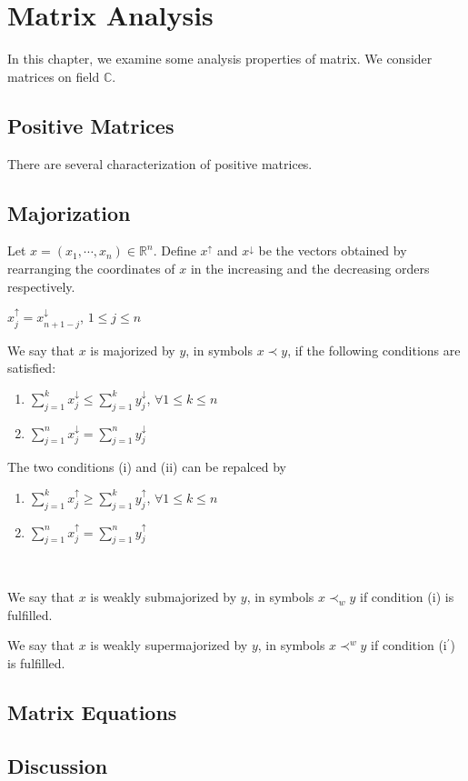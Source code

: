 
\chapter{Matrix Analysis}
In this chapter, we examine some analysis properties of matrix. We consider matrices on field $\mathbb{C}$.

\section{Positive Matrices}
\begin{theorem}
    There are several characterization of positive matrices.\par

\end{theorem}

\section{Majorization}
\begin{definition}
Let $x=(x_1,\cdots,x_n)\in\mathbb{R}^n$. Define $x^\uparrow$ and $x^\downarrow$ be the vectors obtained by rearranging the coordinates of $x$ in the increasing and the decreasing orders respectively.
\end{definition}
\begin{remark}
$x_j^\uparrow=x_{n+1-j}^\downarrow$,    $1\leq j\leq n$
\end{remark}
\begin{definition}
We say that $x$ is majorized by $y$, in symbols $x\prec y$, if the following conditions are satisfied: 
\begin{enumerate}[label=(\roman*)]
    \item $\sum_{j=1}^k x_j^\downarrow \leq \sum_{j=1}^k y_j^\downarrow$, $\forall 1\leq k \leq n$
    \item $\sum_{j=1}^n x_j^\downarrow = \sum_{j=1}^n y_j^\downarrow$
\end{enumerate}
\end{definition}
\begin{remark}
The two conditions (i) and (ii) can be repalced by
\begin{enumerate}[label=(\roman*$^\prime$)]
    \item $\sum_{j=1}^k x_j^\uparrow \geq \sum_{j=1}^k y_j^\uparrow$, $\forall 1\leq k \leq n$
    \item $\sum_{j=1}^n x_j^\uparrow = \sum_{j=1}^n y_j^\uparrow$
\end{enumerate}
\end{remark}
\begin{definition}
\,\par
We say that $x$ is weakly submajorized by $y$, in symbols $x\prec_w y$ if condition (i) is fulfilled.\par
We say that $x$ is weakly supermajorized by $y$, in symbols $x\prec^w y$ if condition (i$^\prime$) is fulfilled.
\end{definition}


\section{Matrix Equations}\label{Matrix Equations}

\section{Discussion}

\citet{alma990008014770106761}